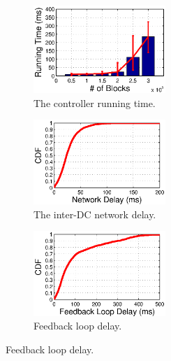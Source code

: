 \begin{figure}[t]
        \centering
        \begin{subfigure}[b]{0.3\textwidth}
                \centering
                \includegraphics[width=50mm]{images/CPUvsBlk_v2.eps}%
                \caption{The controller running time.}
                \label{fig:scale:cpu}
        \end{subfigure}
        \begin{subfigure}[b]{0.3\textwidth}
                \centering
                \includegraphics[width=50mm]{images/NetworkDelay.eps}%
                \caption{The inter-DC network delay.}
                \label{fig:scale:network}
        \end{subfigure}
        \begin{subfigure}[b]{0.3\textwidth}
                \centering
                \includegraphics[width=50mm]{images/CDFofFeedbackLoopDelay.eps}
                \caption{Feedback loop delay.}
                \label{fig:scale:feedback}
        \end{subfigure}
        \label{fig:scale}
\vspace{-0.4cm}
\end{figure}

